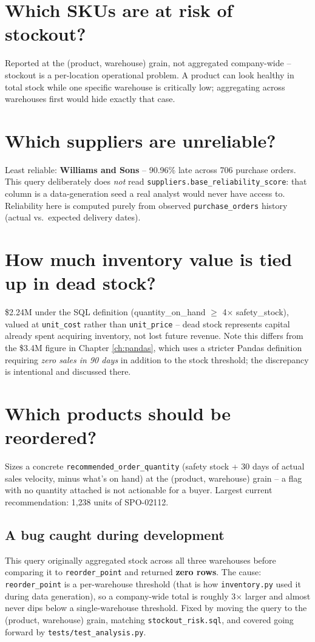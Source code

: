 \documentclass[11pt,a4paper]{report}
\begin{document}
\section{Which SKUs are at risk of stockout?}

Reported at the (product, warehouse) grain, not aggregated company-wide --
stockout is a per-location operational problem. A product can look healthy
in total stock while one specific warehouse is critically low; aggregating
across warehouses first would hide exactly that case.

\section{Which suppliers are unreliable?}

Least reliable: \textbf{Williams and Sons} -- 90.96\% late across 706
purchase orders. This query deliberately does \emph{not} read
\texttt{suppliers.base\_reliability\_score}: that column is a
data-generation seed a real analyst would never have access to. Reliability
here is computed purely from observed \texttt{purchase\_orders} history
(actual vs.\ expected delivery dates).

\section{How much inventory value is tied up in dead stock?}

\$2.24M under the SQL definition (quantity\_on\_hand $\geq$ 4$\times$
safety\_stock), valued at \texttt{unit\_cost} rather than
\texttt{unit\_price} -- dead stock represents capital already spent
acquiring inventory, not lost future revenue. Note this differs from the
\$3.4M figure in Chapter \ref{ch:pandas}, which uses a stricter Pandas
definition requiring \emph{zero sales in 90 days} in addition to the stock
threshold; the discrepancy is intentional and discussed there.

\section{Which products should be reordered?}

Sizes a concrete \texttt{recommended\_order\_quantity} (safety stock + 30
days of actual sales velocity, minus what's on hand) at the (product,
warehouse) grain -- a flag with no quantity attached is not actionable for
a buyer. Largest current recommendation: 1{,}238 units of SPO-02112.

\subsection*{A bug caught during development}
This query originally aggregated stock across all three warehouses before
comparing it to \texttt{reorder\_point} and returned \textbf{zero rows}.
The cause: \texttt{reorder\_point} is a per-warehouse threshold (that is
how \texttt{inventory.py} used it during data generation), so a company-wide
total is roughly 3$\times$ larger and almost never dips below a
single-warehouse threshold. Fixed by moving the query to the (product,
warehouse) grain, matching \texttt{stockout\_risk.sql}, and covered going
forward by \texttt{tests/test\_analysis.py}.
\end{document}
